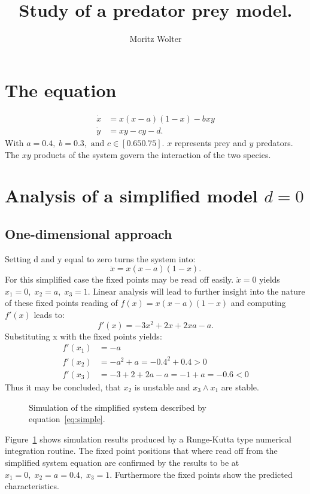 




\title{Study of a predator prey model.}
\author{Moritz Wolter}

\maketitle

\section{The equation}
\begin{align}
\dot{x} &= x(x-a)(1-x) - bxy \\
\label{eq:toBeAn}
\dot{y} &= xy - cy - d.
\end{align}
With $a = 0.4, \; b = 0.3, \text{ and } c \in [0.65 0.75]$. $x$ represents prey and $y$ predators. The $xy$ products of the system govern the interaction of the two species. 

\section{Analysis of a simplified model $d=0$}
\subsection{One-dimensional approach}
Setting d and y equal to zero turns the system into:
\begin{equation}
\dot{x} = x(x-a)(1-x).
\label{eq:simple}
\end{equation}
For this simplified case the fixed points may be read off easily. $\dot{x} = 0$ yields $x_1 = 0, \; x_2 = a, \; x_3 = 1$. Linear analysis will lead to further insight into the nature of these fixed points reading of $f(x) =  x(x-a)(1-x)$ and computing $f'(x)$ leads to:
\begin{equation}
f'(x) = -3x^2 + 2x + 2xa -a.
\end{equation}
Substituting x with the fixed points yields:
\begin{align}
f'(x_1) &= -a \\
f'(x_2) &= -a^2 +a = -0.4^2 + 0.4 > 0 \\
f'(x_3) &= -3 + 2 + 2a - a = -1 + a = -0.6 < 0 
\end{align}
Thus it may be concluded, that $x_2$ is unstable and $x_3 \wedge x_1$ are stable.  
\begin{figure}
\centering

\caption{Simulation of the simplified system described by equation~\ref{eq:simple}.}
\label{fig:simpleSim}
\end{figure}
Figure~\ref{fig:simpleSim} shows simulation results produced by a Runge-Kutta type numerical integration routine. The fixed point positions that where read off from the simplified system equation are confirmed by the results to be at $x_1 = 0, \; x_2 = a = 0.4, \; x_3 = 1$. Furthermore the fixed points show the predicted characteristics.

